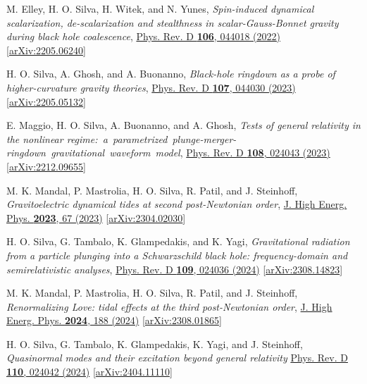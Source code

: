 \documentclass[10pt]{article}
\begin{document}
\begin{bibenum}
    \item M. Elley, H. O. Silva, H. Witek, and N. Yunes,
    \emph{Spin-induced dynamical scalarization, de-scalarization and stealthness in scalar-Gauss-Bonnet gravity during black hole coalescence},
    \href{https://journals.aps.org/prd/abstract/10.1103/PhysRevD.106.044018}{Phys. Rev. D {\bf 106}, 044018 (2022)}
    [\href{https://arxiv.org/abs/2205.06240}{arXiv:2205.06240}]

    \item H. O. Silva, A. Ghosh, and A. Buonanno,
    \emph{Black-hole ringdown as a probe of higher-curvature gravity theories},
    \href{https://journals.aps.org/prd/abstract/10.1103/PhysRevD.107.044030}{Phys. Rev. D {\bf 107}, 044030 (2023)}
    [\href{https://arxiv.org/abs/2212.09655}{arXiv:2205.05132}]

    \item E. Maggio, H. O. Silva, A. Buonanno, and A. Ghosh,
    \emph{Tests of general relativity in the nonlinear regime:~a~parametrized~plunge-merger-ringdown~gravitational~waveform~model},
    \href{https://link.aps.org/doi/10.1103/PhysRevD.108.024043}{Phys. Rev. D {\bf 108}, 024043 (2023)}
    [\href{https://arxiv.org/abs/2212.09655}{arXiv:2212.09655}]

    \item M. K. Mandal, P. Mastrolia, H. O. Silva, R. Patil, and J. Steinhoff,
    \emph{Gravitoelectric dynamical tides at second post-Newtonian order},
    \href{https://link.springer.com/article/10.1007/JHEP11(2023)067}{J. High Energ. Phys. {\bf 2023}, 67 (2023)}
    [\href{https://arxiv.org/abs/2304.02030}{arXiv:2304.02030}]

    \item H. O. Silva, G. Tambalo, K. Glampedakis, and K. Yagi,
    \emph{Gravitational radiation from a particle plunging into a Schwarzschild black hole: frequency-domain and semirelativistic analyses},
    \href{https://journals.aps.org/prd/abstract/10.1103/PhysRevD.109.024036}{Phys. Rev. D {\bf 109}, 024036 (2024)}
    [\href{https://arxiv.org/abs/2308.14823}{arXiv:2308.14823}]

    \item M. K. Mandal, P. Mastrolia, H. O. Silva, R. Patil, and J. Steinhoff,
    \emph{Renormalizing Love: tidal effects at the third post-Newtonian order},
    \href{https://link.springer.com/article/10.1007/JHEP02(2024)188}{J. High Energ. Phys. {\bf 2024}, 188 (2024)}
    [\href{https://arxiv.org/abs/2308.01865}{arXiv:2308.01865}]

    \item H. O. Silva, G. Tambalo, K. Glampedakis, K. Yagi, and J. Steinhoff,
    \emph{Quasinormal modes and their excitation beyond general relativity}
    \href{https://journals.aps.org/prd/abstract/10.1103/PhysRevD.110.024042}{Phys. Rev. D {\bf 110}, 024042 (2024)}
    [\href{https://arxiv.org/abs/2404.11110}{arXiv:2404.11110}]
\end{bibenum}
\end{document}
